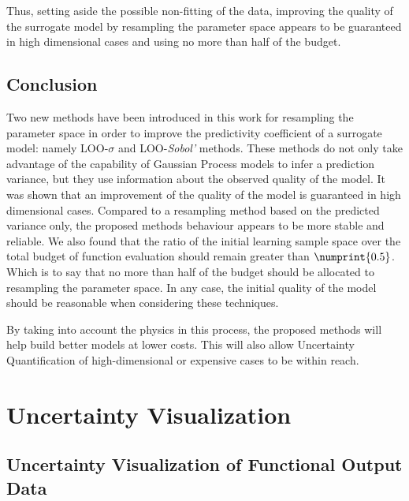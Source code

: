 Thus, setting aside the possible non-fitting of the data, improving the quality of the surrogate model by resampling the parameter space appears to be guaranteed in high dimensional cases and using no more than half of the budget.


\section{Conclusion}

Two new methods have been introduced in this work for resampling the parameter space in order to improve the predictivity coefficient of a surrogate model: namely LOO-$\sigma$ and LOO-\textit{Sobol'} methods. These methods do not only take advantage of the capability of Gaussian Process models to infer a prediction variance, but they use information about the observed quality of the model. It was shown that an improvement of the quality of the model is guaranteed in high dimensional cases. Compared to a resampling method based on the predicted variance only, the proposed methods behaviour appears to be more stable and reliable. We also found that the ratio of the initial learning sample space over the total budget of function evaluation should remain greater than $\numprint{0.5}$. Which is to say that no more than half of the budget should be allocated to resampling the parameter space. In any case, the initial quality of the model should be reasonable when considering these techniques.

By taking into account the physics in this process, the proposed methods will help build better models at lower costs. This will also allow Uncertainty Quantification of high-dimensional or expensive cases to be within reach.

\chapter{Uncertainty Visualization}



\section{Uncertainty Visualization of Functional Output Data}
\label{sec:uqvisu}

